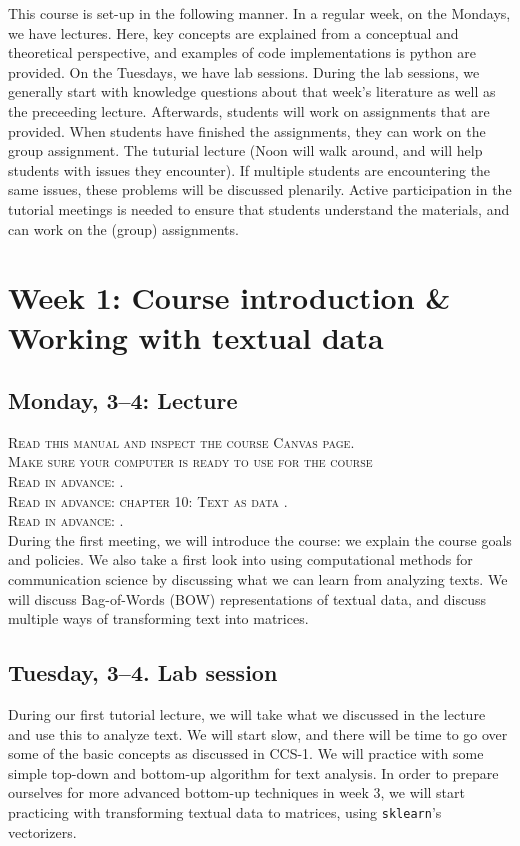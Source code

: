 This course is set-up in the following manner. In a regular week, on the Mondays, we have lectures. Here, key concepts are explained from a conceptual and theoretical perspective, and examples of code implementations is python are provided.  On the Tuesdays, we have lab sessions. During the lab sessions, we generally start with knowledge questions about that week's literature as well as the preceeding lecture. Afterwards, students will work on assignments that are provided. When students have finished the assignments, they can work on the group assignment. The tuturial lecture (Noon will walk around, and will help students with issues they encounter). If multiple students are encountering the same issues, these problems will be discussed plenarily. Active participation in the tutorial meetings is needed to ensure that students understand the materials, and can work on the (group) assignments.

\section*{Week 1: Course introduction \& Working with textual data}

\subsection*{Monday, 3--4: Lecture}
\textsc{ Read this manual and inspect the course Canvas page.}\\
\textsc{ Make sure your computer is ready to use for the course }\\
\textsc{ Read in advance: \cite{Hirschenberg2015}.} \\
\textsc{Read in advance: chapter 10: Text as data \cite{van_atteveldt_computational_2022}.} \\
\textsc{Read in advance: \cite{Boumans2016}.} \\
During the first meeting, we will introduce the course: we explain the course goals and policies. We also take a first look into using computational methods for communication science by discussing what we can learn from analyzing texts.
We will discuss Bag-of-Words (BOW) representations of textual data, and discuss multiple ways of transforming text into matrices. 

\subsection*{Tuesday, 3--4. Lab session}
During our first tutorial lecture, we will take what we discussed in the lecture and use this to analyze text. We will start slow, and there will be time to go over some of the basic concepts as discussed in CCS-1.
We will practice with some simple top-down and bottom-up algorithm for text analysis. In order to prepare ourselves for more advanced bottom-up techniques in week 3, we will start practicing with transforming textual data to matrices, using  \texttt{sklearn}'s vectorizers. 


